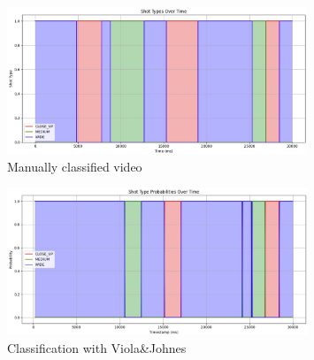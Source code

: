 \documentclass[english]{article}
\begin{document}
		

		\begin{figure}[H]
			\centering
			\includegraphics[width=0.8\textwidth]{figures/marvel_ref_graph.jpg}
			\caption{Manually classified video \cite{marvel}}
			\label{fig:marvel_ref}
		\end{figure}

		\begin{figure}[H]
			\centering
			\includegraphics[width=0.8\textwidth]{figures/marvel_real_graph.jpg}
			\caption{Classification with Viola\&Johnes}
			\label{fig:marvel_real}
		\end{figure}
\end{document}
